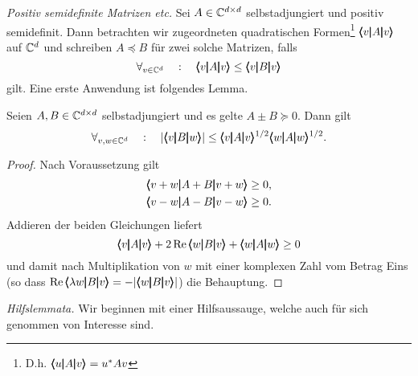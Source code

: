 \medskip\noindent
{\em Positiv semidefinite Matrizen etc.}
Sei $A\in\mathbb C^{d\times d}$ selbstadjungiert und positiv semidefinit. Dann betrachten wir zugeordneten quadratischen Formen\footnote{D.h. $\pmb\langle u\pmb|A\pmb|v\pmb\rangle = u^* A v$} $\pmb\langle v\pmb|A\pmb|v\pmb\rangle$ auf $\mathbb C^d$ und  schreiben $A \preceq B$ für zwei solche Matrizen, falls 
\begin{equation}
   \forall_{v\in\mathbb C^d} \quad:\quad \pmb\langle v\pmb|A\pmb|v\pmb\rangle\le \pmb\langle v\pmb|B\pmb|v\pmb\rangle
\end{equation}
gilt. Eine erste Anwendung ist folgendes Lemma.

\begin{lem}\label{Matrizenlemma}
	Seien $A,B\in\mathbb C^{d\times d}$ selbstadjungiert und es gelte $A\pm B \succeq 0$. Dann gilt
	\begin{equation}
		\forall_{v,w \in \mathbb{C}^d} \quad: \quad \vert \pmb\langle v\pmb|B\pmb|w\pmb\rangle \vert \le \pmb\langle v\pmb|A\pmb|v\pmb\rangle^{{1}/{2}}\pmb\langle w\pmb|A\pmb|w\pmb\rangle^{{1}/{2}}. 
	\end{equation}
\end{lem}
\begin{proof}
	Nach Voraussetzung gilt
	\begin{equation}\begin{split}
		&\pmb\langle v+w\pmb|A+B\pmb|v+w\pmb\rangle \ge 0,\\
		&\pmb\langle v-w\pmb|A-B\pmb|v-w\pmb\rangle \ge 0.
		\end{split}
	\end{equation}
	Addieren der beiden Gleichungen liefert
	\begin{equation}
		\pmb\langle v\pmb|A\pmb|v\pmb\rangle+2\operatorname{Re} \pmb\langle w\pmb|B\pmb|v\pmb\rangle +\pmb\langle w\pmb|A\pmb|w\pmb\rangle \ge 0
	\end{equation}
	und damit nach Multiplikation von $w$ mit einer komplexen Zahl vom Betrag Eins (so dass $\operatorname{Re} \pmb\langle\lambda w\pmb|B\pmb|v\pmb\rangle = - | \pmb\langle w\pmb|B\pmb|v\pmb\rangle|$) die Behauptung. 
\end{proof}

\medskip\noindent
{\em Hilfslemmata.} Wir beginnen mit einer Hilfsaussauge, welche auch für sich genommen von Interesse sind. 

